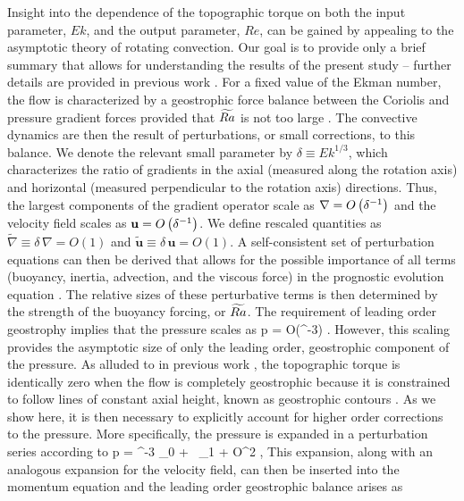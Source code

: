 \textcolor{\revtxt}{Insight into the dependence of the topographic torque on both the input parameter, $Ek$, and the output parameter, $Re$, can be gained by appealing to the asymptotic theory of rotating convection. Our goal is to provide only a brief summary that allows for understanding the results of the present study -- further details are provided in previous work \citep{mC13,mS06,jN24}. For a fixed value of the Ekman number, the flow is characterized by a geostrophic force balance between the Coriolis and pressure gradient forces provided that $\widetilde{Ra}$ is not too large \citep[e.g.][]{sM21}.
The convective dynamics are then the result of perturbations, or small corrections, to this balance. We denote the relevant small parameter by $\delta \equiv Ek^{1/3}$, which characterizes the ratio of gradients in the axial (measured along the rotation axis) and horizontal (measured perpendicular to the rotation axis) directions.
Thus, the largest components of the gradient operator scale as $\nabla = O\left ( \delta^{-1} \right )$ and the velocity field scales as $\mathbf{u} = O\left ( \delta^{-1} \right )$. We define rescaled quantities as $\widetilde{\nabla} \equiv \delta \, \nabla = O(1)$  and $\widetilde{\mathbf{u}} \equiv \delta \, \mathbf{u} = O(1)$. A self-consistent set of perturbation equations can then be derived that allows for the possible importance of all terms (buoyancy, inertia, advection, and the viscous force) in the prognostic evolution equation \citep[][]{mC13,jN24}. The relative sizes of these perturbative terms is then determined by the strength of the buoyancy forcing, or $\widetilde{Ra}$. The requirement of leading order geostrophy implies that the pressure scales as
\be
p = O(\delta^{-3}) .
\ee
However, this scaling provides the asymptotic size of only the leading order, geostrophic component of the pressure. As alluded to in previous work \citep{aA77b,pR88}, the topographic torque is identically zero when the flow is completely geostrophic because it is constrained to follow lines of constant axial height, known as geostrophic contours \citep{hG68}. As we show here, it is then necessary to explicitly account for higher order corrections to the pressure. More specifically, the pressure is expanded in a perturbation series according to 
\be
p = \delta^{-3} \ls {}_0 + \delta \, _1 + O\lb \delta^2 \rb \rs,
\label{E:press}
\ee
This expansion, along with an analogous expansion for the velocity field, can then be inserted into the momentum equation and the leading order geostrophic balance arises as
}
